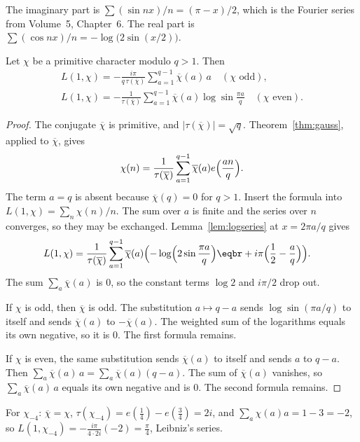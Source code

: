 The imaginary part is $\sum(\sin nx)/n=(\pi-x)/2$, which is the Fourier series from Volume~5, Chapter~6. The real part is $\sum(\cos nx)/n=-\log\bigl(2\sin(x/2)\bigr)$.

\begin{theorem}\label{thm:l1formula}
Let $\chi$ be a primitive character modulo $q>1$. Then
\[
\begin{gathered}L(1,\chi)=-\frac{i\pi}{q\,\tau(\overline\chi)}\sum_{a=1}^{q-1}\overline\chi(a)\,a\quad(\chi\text{ odd}),\\
L(1,\chi)=-\frac1{\tau(\overline\chi)}\sum_{a=1}^{q-1}\overline\chi(a)\log\sin\frac{\pi a}q\quad(\chi\text{ even}).\end{gathered}
\]
\end{theorem}
\begin{proof}
The conjugate $\overline\chi$ is primitive, and $|\tau(\overline\chi)|=\sqrt q$. Theorem~\ref{thm:gauss}, applied to $\overline\chi$, gives
\[
\chi(n)=\frac1{\tau(\overline\chi)}\sum_{a=1}^{q-1}\overline\chi(a)e\Bigl(\frac{an}q\Bigr).
\]
The term $a=q$ is absent because $\overline\chi(q)=0$ for $q>1$. Insert the formula into $L(1,\chi)=\sum_n\chi(n)/n$. The sum over $a$ is finite and the series over $n$ converges, so they may be exchanged. Lemma~\ref{lem:logseries} at $x=2\pi a/q$ gives
\[
\begin{aligned}L(1,\chi)&=\frac1{\tau(\overline\chi)}\sum_{a=1}^{q-1}\overline\chi(a)\Bigl(-\log\Bigl(2\sin\frac{\pi a}q\Bigr)\eqbr+i\pi\Bigl(\frac12-\frac aq\Bigr)\Bigr).\end{aligned}
\]
The sum $\sum_a\overline\chi(a)$ is $0$, so the constant terms $\log 2$ and $i\pi/2$ drop out.

If $\chi$ is odd, then $\overline\chi$ is odd. The substitution $a\mapsto q-a$ sends $\log\sin(\pi a/q)$ to itself and sends $\overline\chi(a)$ to $-\overline\chi(a)$. The weighted sum of the logarithms equals its own negative, so it is $0$. The first formula remains.

If $\chi$ is even, the same substitution sends $\overline\chi(a)$ to itself and sends $a$ to $q-a$. Then $\sum_a\overline\chi(a)\,a=\sum_a\overline\chi(a)(q-a)$. The sum of $\overline\chi(a)$ vanishes, so $\sum_a\overline\chi(a)\,a$ equals its own negative and is $0$. The second formula remains.
\end{proof}

\begin{example}\label{ex:leibniz}
For $\chi_{-4}$: $\overline\chi=\chi$, $\tau(\chi_{-4})=e(\frac14)-e(\frac34)=2i$, and $\sum_a\chi(a)a=1-3=-2$, so $L(1,\chi_{-4})=-\frac{i\pi}{4\cdot2i}(-2)=\frac\pi4$, Leibniz's series.
\end{example}

